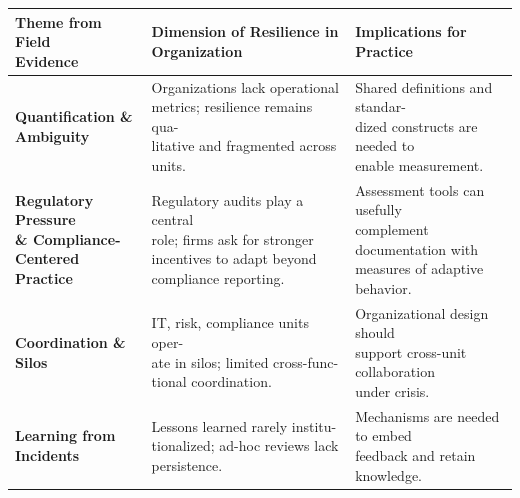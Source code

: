 
\begin{table}[H]
    \centering
    \singlespacing
    \begin{tabular}{p{} p{} p{}}
        \toprule
        \makecell[tl]{\textbf{Theme from Field} \\  \textbf{Evidence}} & \textbf{Dimension of Resilience in Organization}  &  \textbf{Implications for Practice}\\
        \midrule
        \makecell[tl]{\textbf{Quantification \&} \\ \textbf{Ambiguity}} & \makecell[tl]{Organizations lack operational\\ metrics; resilience remains qua- \\litative and fragmented across \\ units.} & \makecell[l]{Shared definitions and standar- \\ dized constructs are needed to \\ enable measurement.}\\
         \makecell[tl]{\textbf{Regulatory Pressure} \\ \textbf{\& Compliance-} \\ \textbf{Centered Practice}} &
        \makecell[tl]{Regulatory audits play a central\\ role; firms ask for stronger\\ incentives to adapt beyond\\ compliance reporting.} &
        \makecell[tl]{Assessment tools can usefully\\ complement documentation with \\ measures of adaptive behavior.} \\
        \makecell[tl]{\textbf{Coordination \&} \\ \textbf{Silos}} & \makecell[tl]{IT, risk, compliance units oper- \\ate in silos; limited cross-func- \\tional coordination.} & \makecell[l]{Organizational design should \\ support cross-unit collaboration \\ under crisis.}\\
        \makecell[tl]{\textbf{Learning from} \\ \textbf{Incidents}} & \makecell[tl]{Lessons learned rarely institu-\\tionalized; ad-hoc reviews lack \\ persistence.} & \makecell[l]{Mechanisms are needed to embed \\ feedback and retain knowledge.}\\[3em]

\end{tabular}
\end{table}
